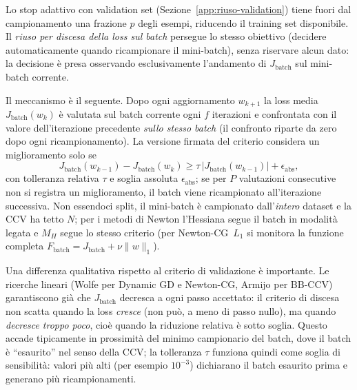 \documentclass[a4paper,12pt]{article}
\numberwithin{equation}{section}
\numberwithin{figure}{section}
\numberwithin{table}{section}
\begin{document}
Lo stop adattivo con validation set
(Sezione~\ref{app:riuso-validation}) tiene fuori dal campionamento una
frazione $p$ degli esempi, riducendo il training set disponibile. Il
\emph{riuso per discesa della loss sul batch} persegue lo stesso obiettivo
(decidere automaticamente quando ricampionare il mini-batch), senza
riservare alcun dato: la decisione è presa osservando esclusivamente
l'andamento di $J_{\mathrm{batch}}$ sul mini-batch corrente.

Il meccanismo è il seguente. Dopo ogni aggiornamento $w_{k+1}$ la loss media
$J_{\mathrm{batch}}(w_k)$ è valutata sul batch corrente ogni $f$ iterazioni e
confrontata con il valore dell'iterazione precedente \emph{sullo stesso
batch} (il confronto riparte da zero dopo ogni ricampionamento). La versione
firmata del criterio considera un miglioramento solo se
\[
J_{\mathrm{batch}}(w_{k-1})-J_{\mathrm{batch}}(w_k)
\ge \tau\,\lvert J_{\mathrm{batch}}(w_{k-1})\rvert+\epsilon_{\mathrm{abs}},
\]
con tolleranza relativa $\tau$ e soglia assoluta $\epsilon_{\mathrm{abs}}$;
se per $P$ valutazioni consecutive non si registra un miglioramento, il batch
viene ricampionato all'iterazione successiva. Non essendoci split, il
mini-batch è campionato dall'\emph{intero} dataset e la CCV ha tetto $N$; per
i metodi di Newton l'Hessiana segue il batch in modalità legata e $M_H$
segue lo stesso criterio (per Newton-CG~$L_1$ si monitora la funzione
completa $F_{\mathrm{batch}}=J_{\mathrm{batch}}+\nu\lVert w\rVert_1$).

Una differenza qualitativa rispetto al criterio di validazione è importante.
Le ricerche lineari (Wolfe per Dynamic GD e Newton-CG, Armijo per BB-CCV)
garantiscono già che $J_{\mathrm{batch}}$ decresca a ogni passo accettato: il
criterio di discesa non scatta quando la loss \emph{cresce} (non può, a meno
di passo nullo), ma quando \emph{decresce troppo poco}, cioè quando la
riduzione relativa è sotto soglia. Questo accade tipicamente in prossimità
del minimo campionario del batch, dove il batch è ``esaurito'' nel senso
della CCV; la tolleranza $\tau$ funziona quindi come soglia di sensibilità:
valori più alti (per esempio $10^{-3}$) dichiarano il batch esaurito prima e
generano più ricampionamenti.

\end{document}
